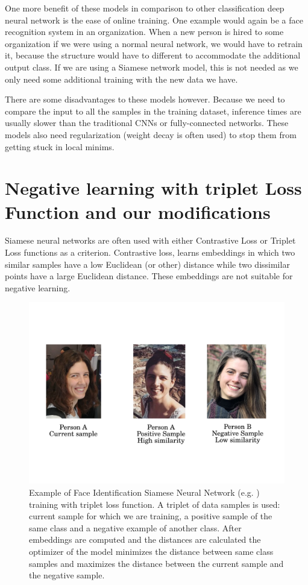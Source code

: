 \documentclass[b5paper]{book}
\let\cite\parencite
\begin{document}
One more benefit of these models in comparison to other classification deep neural network is the ease of online training. One example would again be a face recognition system in an organization. When a new person is hired to some organization if we were using a normal neural network, we would have to retrain it, because the structure would have to different to accommodate the additional output class. If we are using a Siamese network model, this is not needed as we only need some additional training with the new data we have. 

There are some disadvantages to these models however. Because we need to compare the input to all the samples in the training dataset, inference times are usually slower than the traditional CNNs or fully-connected networks. These models also need regularization (weight decay is often used) to stop them from getting stuck in local minims. 

\section{Negative learning with triplet Loss Function and our modifications}

Siamese neural networks are often used with either Contrastive Loss \cite{melekhov2016siamese} or Triplet Loss \cite{dong2018triplet} functions as a criterion. Contrastive loss, learns embeddings in which two similar samples have a low Euclidean (or other) distance while two dissimilar points have a large Euclidean distance. These embeddings are not suitable for negative learning.

\begin{figure}
    \centering
    \includegraphics[trim=0.5cm 2.6cm 0.5cm 5cm,scale=0.73]{figures/siamese.pdf}
    \caption{Example of Face Identification Siamese Neural Network (e.g. \cite{varior2016gated}) training with triplet loss function. A triplet of data samples is used: current sample for which we are training, a positive sample of the same class and a negative example of another class. After embeddings are computed and the distances are calculated the optimizer of the model minimizes the distance between same class samples and maximizes the distance between the current sample and the negative sample.}
    \label{fig:siamese}
\end{figure}
\end{document}
